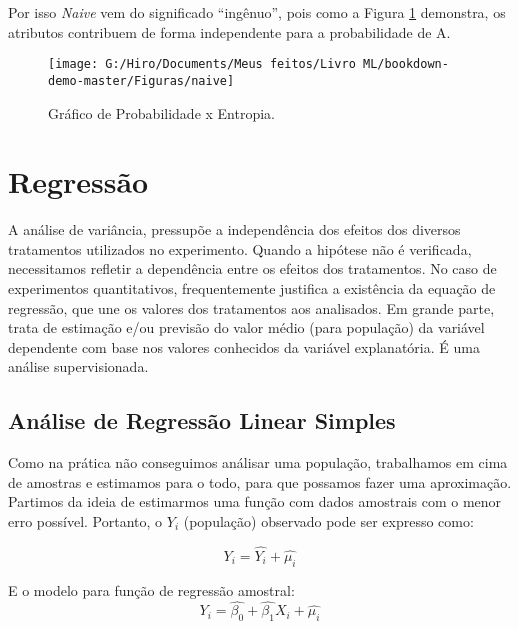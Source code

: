 \documentclass[
  openany]{book}
\begin{document}
Por isso \emph{Naive} vem do significado ``ingênuo'', pois como a Figura \ref{fig:naive} demonstra, os atributos contribuem de forma independente para a probabilidade de A.

\begin{figure}

{\centering \texttt{[image: G:/Hiro/Documents/Meus feitos/Livro ML/bookdown-demo-master/Figuras/naive]} 

}

\caption{Gráfico de Probabilidade x Entropia.}\label{fig:naive}
\end{figure}



\hypertarget{reg}{%
\section{Regressão}\label{reg}}

A análise de variância, pressupõe a independência dos efeitos dos diversos tratamentos utilizados no experimento. Quando a hipótese não é verificada, necessitamos refletir a dependência entre os efeitos dos tratamentos. No caso de experimentos quantitativos, frequentemente justifica a existência da equação de regressão, que une os valores dos tratamentos aos analisados. Em grande parte, trata de estimação e/ou previsão do valor médio (para população) da variável dependente com base nos valores conhecidos da variável explanatória. É uma análise supervisionada.

\hypertarget{reglin}{%
\subsection{Análise de Regressão Linear Simples}\label{reglin}}

Como na prática não conseguimos análisar uma população, trabalhamos em cima de amostras e estimamos para o todo, para que possamos fazer uma aproximação. Partimos da ideia de estimarmos uma função com dados amostrais com o menor erro possível. Portanto, o \(Y_i\) (população) observado pode ser expresso como:

\begin{equation}
    Y_i=\hat{Y_i}+\hat{\mu_i}
    \label{eq:frp}
\end{equation}

E o modelo para função de regressão amostral:
\begin{equation}
    Y_i=\hat{\beta_0}+\hat{\beta_1}X_i+\hat{\mu_i}
    \label{eq:fra}
\end{equation}
\end{document}
